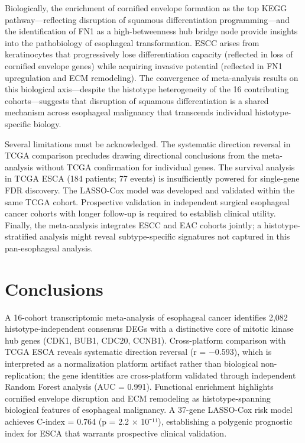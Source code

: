 \documentclass[
  12pt,
]{article}
\begin{document}
Biologically, the enrichment of cornified envelope formation as the top
KEGG pathway---reflecting disruption of squamous differentiation
programming---and the identification of FN1 as a high-betweenness hub
bridge node provide insights into the pathobiology of esophageal
transformation. ESCC arises from keratinocytes that progressively lose
differentiation capacity (reflected in loss of cornified envelope genes)
while acquiring invasive potential (reflected in FN1 upregulation and
ECM remodeling). The convergence of meta-analysis results on this
biological axis---despite the histotype heterogeneity of the 16
contributing cohorts---suggests that disruption of squamous
differentiation is a shared mechanism across esophageal malignancy that
transcends individual histotype-specific biology.

Several limitations must be acknowledged. The systematic direction
reversal in TCGA comparison precludes drawing directional conclusions
from the meta-analysis without TCGA confirmation for individual genes.
The survival analysis in TCGA ESCA (184 patients; 77 events) is
insufficiently powered for single-gene FDR discovery. The LASSO-Cox
model was developed and validated within the same TCGA cohort.
Prospective validation in independent surgical esophageal cancer cohorts
with longer follow-up is required to establish clinical utility.
Finally, the meta-analysis integrates ESCC and EAC cohorts jointly; a
histotype-stratified analysis might reveal subtype-specific signatures
not captured in this pan-esophageal analysis.

\section{Conclusions}\label{conclusions}

A 16-cohort transcriptomic meta-analysis of esophageal cancer identifies
2,082 histotype-independent consensus DEGs with a distinctive core of
mitotic kinase hub genes (CDK1, BUB1, CDC20, CCNB1). Cross-platform
comparison with TCGA ESCA reveals systematic direction reversal (r =
−0.593), which is interpreted as a normalization platform artifact
rather than biological non-replication; the gene identities are
cross-platform validated through independent Random Forest analysis (AUC
= 0.991). Functional enrichment highlights cornified envelope disruption
and ECM remodeling as histotype-spanning biological features of
esophageal malignancy. A 37-gene LASSO-Cox risk model achieves C-index =
0.764 (p = 2.2 × 10⁻¹¹), establishing a polygenic prognostic index for
ESCA that warrants prospective clinical validation.
\end{document}
